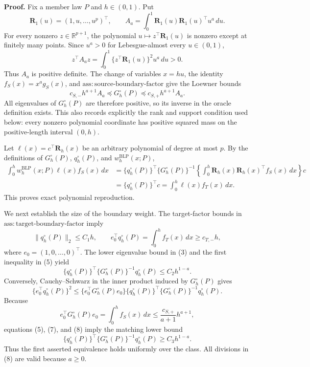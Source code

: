 \textbf{Proof.}
Fix a member law \(P\) and \(h\in(0,1)\). Put
\[
\mathbf R_1(u)=(1,u,\ldots,u^p)^\top,
\qquad
A_a=\int_0^1\mathbf R_1(u)\mathbf R_1(u)^\top u^a\,du.
\tag{1}
\]
For every nonzero \(z\in\mathbb R^{p+1}\), the polynomial
\(u\mapsto z^\top\mathbf R_1(u)\) is nonzero except at finitely many points. Since
\(u^a>0\) for Lebesgue-almost every \(u\in(0,1)\),
\[
z^\top A_a z=\int_0^1\{z^\top\mathbf R_1(u)\}^2u^a\,du>0.
\tag{2}
\]
Thus \(A_a\) is positive definite. The change of variables \(x=hu\), the identity
\(f_S(x)=x^ag_S(x)\), and \(\mathrm{ass:source\text{-}boundary\text{-}factor}\) give the Loewner bounds
\[
c_{S,-}h^{a+1}A_a
\preceq G_h^{\circ}(P)
\preceq c_{S,+}h^{a+1}A_a.
\tag{3}
\]
All eigenvalues of \(G_h^{\circ}(P)\) are therefore positive, so its inverse in the oracle definition exists. This also records explicitly the rank and support condition used below: every nonzero polynomial coordinate has positive squared mass on the positive-length interval \((0,h)\).

Let \(\ell(x)=c^\top\mathbf R_h(x)\) be an arbitrary polynomial of degree at most \(p\). By the definitions of \(G_h^{\circ}(P)\), \(q_h^{\circ}(P)\), and \(w_h^{\mathrm{BLP}}(x;P)\),
\[
\begin{aligned}
\int_0^h w_h^{\mathrm{BLP}}(x;P)\ell(x)f_S(x)\,dx
&=\{q_h^{\circ}(P)\}^\top\{G_h^{\circ}(P)\}^{-1}
  \left\{\int_0^h\mathbf R_h(x)\mathbf R_h(x)^\top f_S(x)\,dx\right\}c\\
&=\{q_h^{\circ}(P)\}^\top c
=\int_0^h\ell(x)f_T(x)\,dx.
\end{aligned}
\tag{4}
\]
This proves exact polynomial reproduction.

We next establish the size of the boundary weight. The target-factor bounds in \(\mathrm{ass:target\text{-}boundary\text{-}factor}\) imply
\[
\|q_h^{\circ}(P)\|_2\le C_1h,
\qquad
e_0^\top q_h^{\circ}(P)=\int_0^hf_T(x)\,dx\ge c_{T,-}h,
\tag{5}
\]
where \(e_0=(1,0,\ldots,0)^\top\). The lower eigenvalue bound in (3) and the first inequality in (5) yield
\[
\{q_h^{\circ}(P)\}^\top\{G_h^{\circ}(P)\}^{-1}q_h^{\circ}(P)\le C_2h^{1-a}.
\tag{6}
\]
Conversely, Cauchy--Schwarz in the inner product induced by \(G_h^{\circ}(P)\) gives
\[
\{e_0^\top q_h^{\circ}(P)\}^2
\le\{e_0^\top G_h^{\circ}(P)e_0\}
\{q_h^{\circ}(P)\}^\top\{G_h^{\circ}(P)\}^{-1}q_h^{\circ}(P).
\tag{7}
\]
Because
\[
e_0^\top G_h^{\circ}(P)e_0=\int_0^hf_S(x)\,dx
\le \frac{c_{S,+}}{a+1}h^{a+1},
\tag{8}
\]
equations (5), (7), and (8) imply the matching lower bound
\[
\{q_h^{\circ}(P)\}^\top\{G_h^{\circ}(P)\}^{-1}q_h^{\circ}(P)\ge C_3h^{1-a}.
\tag{9}
\]
Thus the first asserted equivalence holds uniformly over the class. All divisions in (8) are valid because \(a\ge0\).

